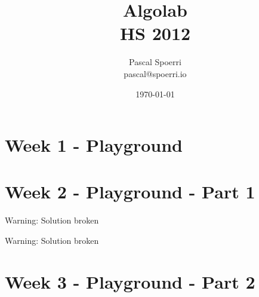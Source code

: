\documentclass[a4paper,titlepage]{article}
\author{Pascal Spoerri\\ pascal@spoerri.io}
\title{Algolab\\HS 2012}
\date{\today}
\begin{document}
\maketitle

\setcounter{tocdepth}{4}

\tableofcontents
\newpage
\setcounter{page}{1}
\part{Week 1 - Playground}












\newpage
\part{Week 2 - Playground - Part 1}





Warning: Solution broken


Warning: Solution broken


\newpage
\part{Week 3 - Playground - Part 2}








\end{document}
